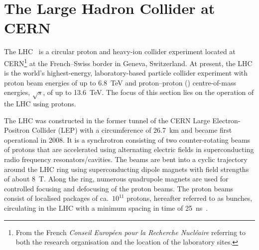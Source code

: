 \section{The Large Hadron Collider at CERN}%
\label{sec:lhc}

The LHC~\cite{Evans:2008zzb} is a circular proton and heavy-ion collider
experiment located at CERN\footnote{From the French \emph{Conseil Européen pour
    la Recherche Nucléaire} referring to both the research organisation and the
  location of the laboratory sites.} at the French--Swiss border in Geneva,
Switzerland. At present, the LHC is the world's highest-energy, laboratory-based
particle collider experiment with proton beam energies of up to \SI{6.8}{\TeV}
and proton--proton (\pp) centre-of-mass energies, $\sqrt{s}$, of up to
\SI{13.6}{\TeV}. The focus of this section lies on the operation of the LHC
using protons.

The LHC was constructed in the former tunnel of the CERN Large Electron-Positron
Collider (LEP) with a circumference of \SI{26.7}{\kilo\metre} and became first
operational in 2008. It is a synchrotron consisting of two counter-rotating
beams of protons that are accelerated using alternating electric fields in
superconducting radio frequency resonators/cavities. The beams are bent into a
cyclic trajectory around the LHC ring using superconducting dipole magnets with
field strengths of about \SI{8}{\tesla}. Along the ring, numerous quadrupole
magnets are used for controlled focusing and defocusing of the proton beams.
The proton beams consist of localised packages of ca.\ $10^{11}$ protons,
hereafter referred to as bunches, circulating in the LHC with a minimum spacing
in time of \SI{25}{\nano\second}~\cite{Evans:2008zzb}.

